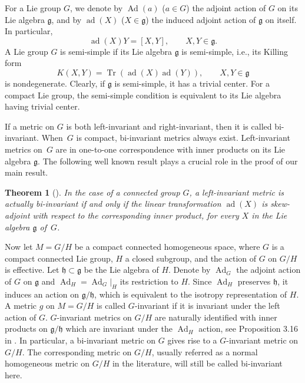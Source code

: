 \documentclass[10pt,a4paper]{amsart}
\newtheorem{Theorem}{Theorem}
\begin{document}
For a Lie group $G$, we denote by $\operatorname{Ad}(a)$ ($a\in G$) the adjoint action of $G$ on its Lie algebra $\mathfrak{g}$, and by $\operatorname{ad}(X)$ ($X\in \mathfrak{g}$) the induced adjoint action of $\mathfrak{g}$ on itself. In particular,
\[
\operatorname{ad}(X)Y=[X, Y], \qquad X, Y \in \mathfrak{g}.
\]
A Lie group $G$ is semi-simple if its Lie algebra $\mathfrak{g}$ is semi-simple, i.e., its Killing form
\[
K(X, Y) = {\operatorname{Tr}}(\operatorname{ad}(X) \operatorname{ad}(Y)), \qquad X, Y \in \mathfrak{g}
\]
is nondegenerate. Clearly, if $\mathfrak{g}$ is semi-simple, it has a trivial center. For a compact Lie group, the semi-simple condition is equivalent to its Lie algebra having trivial center.

If a metric on $G$ is both left-invariant and right-invariant, then it is called bi-invariant. When~$G$ is compact, bi-invariant metrics always exist. Left-invariant metrics on~$G$ are in one-to-one correspondence with inner products on its Lie algebra $\mathfrak{g}$. The following well known result plays a crucial role in the proof of our main result.

\begin{Theorem}[{\cite[Lemma~7.2]{1}}]\label{theorem2}
	In the case of a connected group $G$, a left-invariant metric is actually bi-invariant if and only if the linear transformation
	$\operatorname{ad}(X)$ is skew-adjoint with respect to the corresponding inner product, for every $X$ in the Lie algebra $\mathfrak{g}$ of~$G$.
\end{Theorem}

Now let $M=G/H$ be a compact connected homogeneous space, where $G$ is a compact connected Lie group, $H$ a closed subgroup, and the action of $G$ on $G/H$
is effective.
Let $\mathfrak{h}\subset \mathfrak{g}$ be the Lie algebra of $H$. Denote by $\operatorname{Ad}_G$ the adjoint action of $G$ on $\mathfrak{g}$ and $\operatorname{Ad}_H=\operatorname{Ad}_G|_H$ its restriction to $H$. Since $\operatorname{Ad}_H$ preserves $\mathfrak{h}$, it induces an action on $\mathfrak{g}/\mathfrak{h}$, which is equivalent to the isotropy representation of $H$.
A metric $g$ on $M=G/H$ is called $G$-invariant if it is invariant under the left action of $G$. $G$-invariant metrics on $G/H$ are naturally identified with inner products on $\mathfrak{g}/\mathfrak{h}$ which are invariant under the $\operatorname{Ad}_H$ action, see Proposition 3.16 in \cite{13}. In particular, a bi-invariant metric on $G$ gives rise to a $G$-invariant metric on $G/H$. The corresponding metric on $G/H$, usually
referred as a normal homogeneous metric on $G/H$ in the literature, will still be called bi-invariant here.
\end{document}
